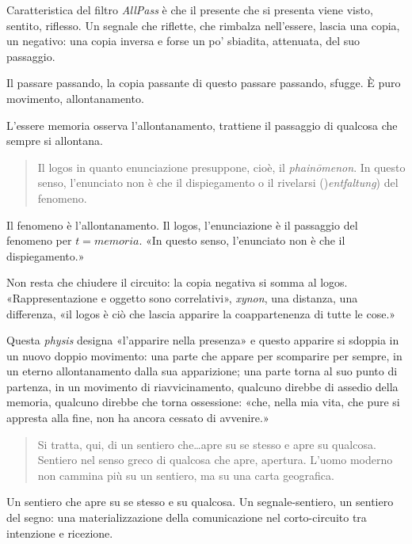 Caratteristica del filtro \emph{AllPass} è che il presente che si presenta viene
visto, sentito, riflesso. Un segnale che riflette, che rimbalza nell'essere,
lascia una copia, un negativo: una copia inversa e forse un po' sbiadita,
attenuata, del suo passaggio.

Il passare passando, la copia passante di questo passare passando, sfugge. È
puro movimento, allontanamento.

L'essere memoria osserva l'allontanamento, trattiene il passaggio di qualcosa
che sempre si allontana.

\begin{quote}
  \begin{sf}
    \small
    Il logos in quanto enunciazione presuppone, cioè, il \emph{phainōmenon}. In
    questo senso, l'enunciato non è che il dispiegamento o il rivelarsi
    ()\emph{entfaltung}) del fenomeno.
  \end{sf}
\end{quote}

Il fenomeno è l'allontanamento. Il logos, l'enunciazione è il passaggio del
fenomeno per $t=memoria$. «In questo senso, l'enunciato non è che il
dispiegamento.»

Non resta che chiudere il circuito: la copia negativa si somma al logos.
«Rappresentazione e oggetto sono correlativi», \emph{xynon}, una distanza,
una differenza, «il logos è ciò che lascia apparire la coappartenenza di tutte
le cose.»

Questa \emph{physis} designa «l'apparire nella presenza» e questo apparire si
sdoppia in un nuovo doppio movimento: una parte che appare per scomparire per
sempre, in un eterno allontanamento dalla sua apparizione; una parte torna al
suo punto di partenza, in un movimento di riavvicinamento, qualcuno direbbe di
assedio della memoria, qualcuno direbbe che torna ossessione: «che, nella mia
vita, che pure si appresta alla fine, non ha ancora cessato di avvenire.»

\begin{quote}
  \begin{sf}
    \small
    Si tratta, qui, di un sentiero che\ldots apre su se stesso e apre su
    qualcosa. Sentiero nel senso greco di qualcosa che apre, apertura. L'uomo
    moderno non cammina più su un sentiero, ma su una carta geografica.
  \end{sf}
\end{quote}

Un sentiero che apre su se stesso e su qualcosa. Un segnale-sentiero, un sentiero
del segno: una materializzazione della comunicazione nel corto-circuito tra
intenzione e ricezione.

